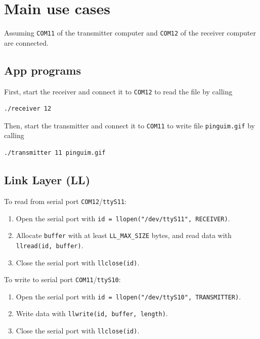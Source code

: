 \documentclass[a4paper, 11pt]{report}
\begin{document}
\section{Main use cases} \label{sec:UseCases}

Assuming \texttt{COM11} of the transmitter computer and \texttt{COM12} of the receiver computer are connected.

\subsection{App programs}

First, start the receiver and connect it to \texttt{COM12} to read the file by calling

\begin{lstlisting}[frame=none, numbers=none, language=sh]
./receiver 12
\end{lstlisting}
Then, start the transmitter and connect it to \texttt{COM11} to write file \texttt{pinguim.gif} by calling

\begin{lstlisting}[frame=none, numbers=none, language=sh]
./transmitter 11 pinguim.gif
\end{lstlisting}
	
\subsection{Link Layer (LL)}

To read from serial port \texttt{COM12}/\texttt{ttyS11}:
\begin{enumerate}
	\itemsep0em
	\item Open the serial port with \texttt{id = llopen("/dev/ttyS11", RECEIVER)}.
	\item Allocate \texttt{buffer} with at least \texttt{LL\_MAX\_SIZE} bytes, and read data with \texttt{llread(id, buffer)}.
	\item Close the serial port with \texttt{llclose(id)}.
\end{enumerate}
To write to serial port \texttt{COM11}/\texttt{ttyS10}:
\begin{enumerate}
	\itemsep0em
	\item Open the serial port with \texttt{id = llopen("/dev/ttyS10", TRANSMITTER)}.
	\item Write data with \texttt{llwrite(id, buffer, length)}.
	\item Close the serial port with \texttt{llclose(id)}.
\end{enumerate}
\end{document}

